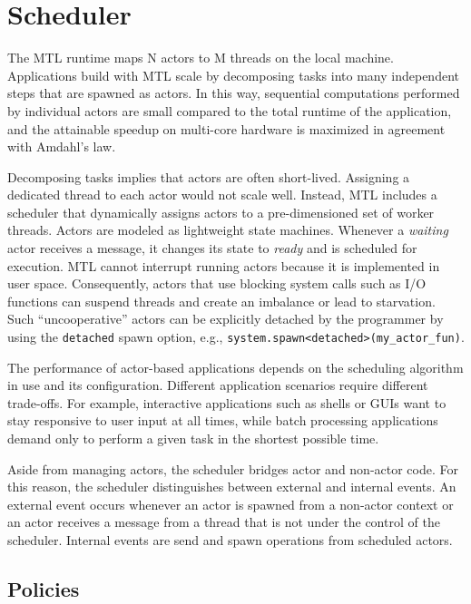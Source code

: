 \section{Scheduler}
\label{scheduler}

The MTL runtime maps N actors to M threads on the local machine. Applications
build with MTL scale by decomposing tasks into many independent steps that are
spawned as actors. In this way, sequential computations performed by individual
actors are small compared to the total runtime of the application, and the
attainable speedup on multi-core hardware is maximized in agreement with
Amdahl's law.

Decomposing tasks implies that actors are often short-lived. Assigning a
dedicated thread to each actor would not scale well. Instead, MTL includes a
scheduler that dynamically assigns actors to a pre-dimensioned set of worker
threads. Actors are modeled as lightweight state machines. Whenever a
\emph{waiting} actor receives a message, it changes its state to \emph{ready}
and is scheduled for execution. MTL cannot interrupt running actors because it
is implemented in user space. Consequently, actors that use blocking system
calls such as I/O functions can suspend threads and create an imbalance or lead
to starvation. Such ``uncooperative'' actors can be explicitly detached by the
programmer by using the \lstinline^detached^ spawn option, e.g.,
\lstinline^system.spawn<detached>(my_actor_fun)^.

The performance of actor-based applications depends on the scheduling algorithm
in use and its configuration. Different application scenarios require different
trade-offs. For example, interactive applications such as shells or GUIs want
to stay responsive to user input at all times, while batch processing
applications demand only to perform a given task in the shortest possible time.

Aside from managing actors, the scheduler bridges actor and non-actor code. For
this reason, the scheduler distinguishes between external and internal events.
An external event occurs whenever an actor is spawned from a non-actor context
or an actor receives a message from a thread that is not under the control of
the scheduler. Internal events are send and spawn operations from scheduled
actors.

\subsection{Policies}
\label{scheduler-policy}

